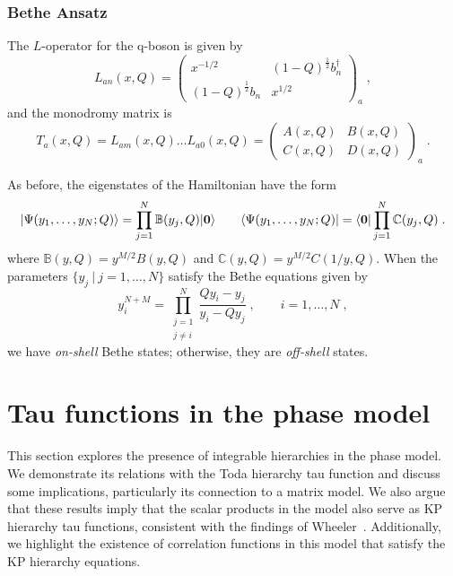 \documentclass[a4paper,11pt]{amsart}
\begin{document}

\subsubsection{Bethe Ansatz}
The \(L\)-operator for the q-boson is given by
\begin{equation}
  L_{an}(x, Q) =
  \begin{pmatrix}
    x^{-1/2} & (1 - Q)^{\frac{1}{2}} b_n^\dagger \\ (1 - Q)^{\frac{1}{2}} b_n & x^{1/2}
  \end{pmatrix}_a\; ,
\end{equation}
and the monodromy matrix is 
\begin{equation}
  T_a(x,Q) = L_{am}(x, Q)  \dots  L_{a0}(x, Q) = 
  \begin{pmatrix}
    A(x, Q) & B(x, Q) \\ C(x, Q) & D(x, Q)
  \end{pmatrix}_a\; .
\end{equation}

As before, the eigenstates of the Hamiltonian have the form
\begin{equation}
  \lvert\Psi(y_1, \dots, y_N; Q)\rangle = \prod_{j=1}^N \mathbb{B}(y_j, Q) \lvert\bm{0}\rangle\qquad 
  \langle\Psi(y_1, \dots, y_N; Q)\rvert = \langle\bm{0}\rvert\prod_{j=1}^N \mathbb{C}(y_j, Q) \; .
\end{equation}
where \(\mathbb{B}(y, Q) = y^{M/2} B(y, Q)\) and \(\mathbb{C}(y, Q) =
y^{M/2} C(1/y, Q)\). When the parameters \(\{ y_j \ | \ j =1, \dots , N\}\)
satisfy the Bethe equations given by
\begin{equation}
  y^{N + M}_i =\prod_{\substack{j = 1 \\ j \neq i}}^N\frac{Q y_i - y_j}{y_i - Q y_j}\; , \qquad i = 1, \dots, N\; , 
\end{equation}
we have \emph{on-shell} Bethe states; otherwise, they are \emph{off-shell} states.



\section{Tau functions in the phase model}

This section explores the presence of integrable hierarchies in the
phase model. We demonstrate its relations with the Toda hierarchy tau
function and discuss some implications, particularly its connection to
a matrix model. We also argue that these results imply that the scalar
products in the model also serve as KP hierarchy tau functions,
consistent with the findings of
Wheeler~\cite{Wheeler:2010vmq}. Additionally, we highlight the
existence of correlation functions in this model that satisfy the KP
hierarchy equations.
\end{document}
